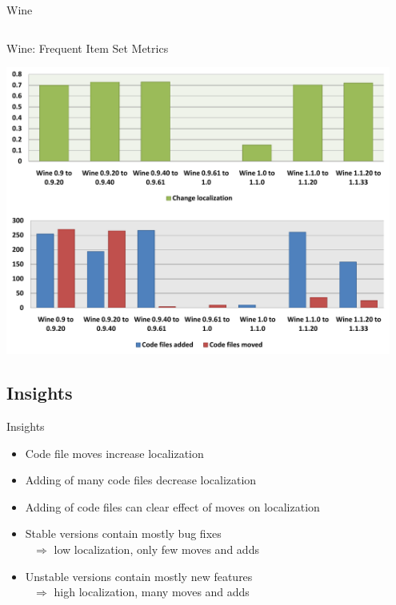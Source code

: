 \begin{frame}{Wine}
\begin{columns}[c]
\begin{column}{0.30\textwidth}
    \end{column}
  \end{columns}
\end{frame}


\begin{frame}{Wine: Frequent Item Set Metrics}
  \begin{center}
    \includegraphics[width=0.95\textwidth]{minings/wine-fis-metrics}
  \end{center}
\end{frame}

\note{
}

\subsection{Insights}

\begin{frame}{Insights}
  \begin{itemize}
  \item Code file moves increase localization
  \item Adding of many code files decrease localization
  \item Adding of code files can clear effect of moves on localization
  \item Stable versions contain mostly bug fixes \\
    $\text{ }\Rightarrow$ low localization, only few moves and adds
  \item Unstable versions contain mostly new features \\
    $\text{ }\Rightarrow$ high localization, many moves and adds
  \end{itemize}
\end{frame}

